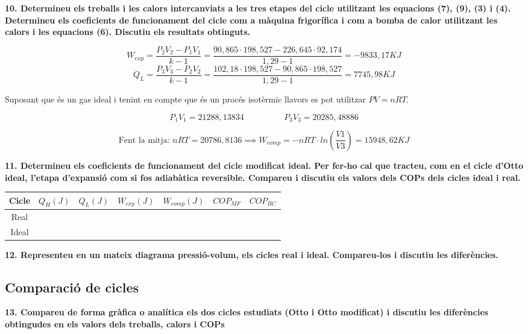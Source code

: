 \documentclass[a4paper]{article}
\begin{document}
\textbf{10. Determineu els treballs i les calors intercanviats a les tres etapes del cicle utilitzant les equacions (7), (9), (3) i (4). Determineu els coeficients de funcionament del cicle com a màquina frigorífica i com a bomba de calor utilitzant les calors i les equacions (6). Discutiu els resultats obtinguts.}

$$ W_{exp} = \frac{P_2 V_2 - P_1 V_1}{k - 1} = 
\frac{90,865·198,527 - 226,645·92,174}{1,29 - 1} = -9833,17 KJ $$
$$ Q_L = \frac{P_3 V_3 - P_2 V_2}{k - 1} = 
\frac{102,18·198,527 - 90,865·198,527}{1,29-1} = 7745,98 KJ $$

Suposant que és un gas ideal i tenint en compte que és un procés isotèrmic llavors es pot utilitzar $ PV = nRT$.

$$ P_1 V_1 = 21288,13834 \hspace{2cm} P_3 V_3 = 20285,48886 $$

$$ \text{Fent la mitja: } nRT = 20786,8136 \implies W_{comp} = -nRT·ln\left(\frac{V1}{V3}\right) = 15948,62 KJ $$

\textbf{11. Determineu els coeficients de funcionament del cicle modificat ideal. Per fer-ho cal que tracteu, com en el cicle d'Otto ideal, l'etapa d'expansió com si fos adiabàtica reversible. Compareu i discutiu els valors dels COPs dels cicles ideal i real.}

\begin{tabular}{c|cccccc}
    Cicle & $Q_H(J)$ & $Q_L(J)$ & $W_{exp}(J)$ & $W_{comp}(J)$ & $COP_{MF}$ & $COP_{BC}$ \\
    \hline
    Real & & & & & & \\
    Ideal & & & & & &
\end{tabular}

\textbf{12. Representeu en un mateix diagrama pressió-volum, els cicles real i ideal. Compareu-los i discutiu les diferències.}

\subsection*{Comparació de cicles}

\textbf{13. Compareu de forma gràfica o analítica els dos cicles estudiats (Otto i Otto modificat) i discutiu les diferències obtingudes en els valors dels treballs, calors i COPs}
\end{document}
